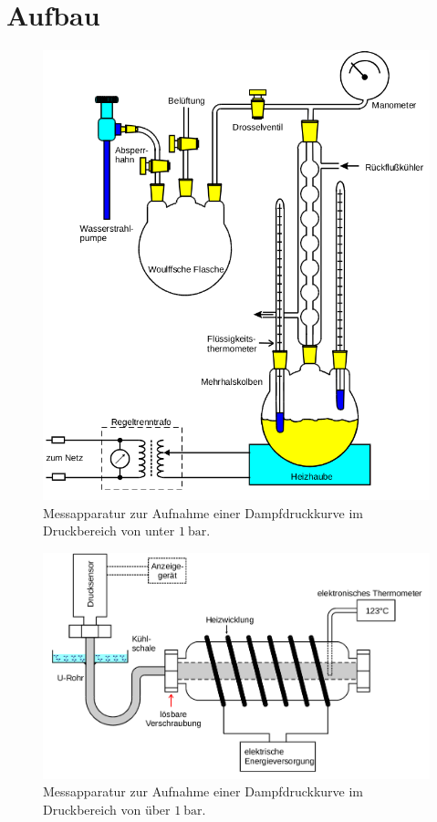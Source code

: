 \section{Aufbau}
\begin{figure}
	\centering
	\includegraphics[width=\linewidth-100pt,height=\textheight-100pt,keepaspectratio]{content/Bilder/V203aufbau1.png}
	\caption{Messapparatur zur Aufnahme einer Dampfdruckkurve im Druckbereich von unter $\SI{1}{\bar}$\cite{V203}.}
	\label{fig:Aufbau1}
\end{figure}
\begin{figure}
	\centering
	\includegraphics[width=\linewidth-100pt,height=\textheight-100pt,keepaspectratio]{content/Bilder/V203aufbau2.png}
	\caption{Messapparatur zur Aufnahme einer Dampfdruckkurve im Druckbereich von über $\SI{1}{\bar}$\cite{V203}.}
	\label{fig:Aufbau2}
\end{figure}
